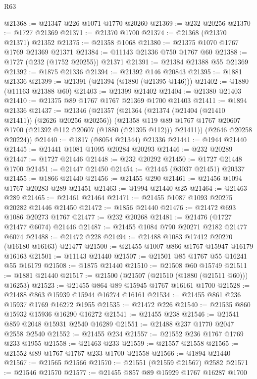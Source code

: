 \begin{lexlean}{R63}
\begin{coremodule}
@21368 := @21347 @226 @1071 @1770 @20260
@21369 := @232 @20256
@21370 := @1727 @21369
@21371 := @21370 @1700
@21374 := @21368 (@21370 @21371) @21352
@21375 := @21358 @1068
@21380 := @21375 @1070 @1767 @1769 @21369 @21371
@21384 := @11143 @21336 @750 @1767 @60
@21388 := @1727 (@232 (@1752 @20255)) @21371
@21391 := @21384 @21388 @55 @21369
@21392 := @1875 @21336
@21394 := @21392 @146 @20843
@21395 := @1881 @21336
@21399 := @21391 (@21394 (@1880 (@21395 @146)))
@21402 := @1880 (@11163 @21388 @60)
@21403 := @21399 @21402
@21404 := @21380 @21403
@21410 := @21375 @89 @1767 @1767 @21369 @1700 @21403
@21411 := @1894 @21336
@21437 := @21346
    (@21357
      (@21364
        (@21374 (@21404 (@21410 @21411)) (@2626 @20256 @20256))
        (@21358
          @119
          @89
          @1767
          @1767
          @20607
          @1700
          (@21392 @112 @20607 (@1880 (@21395 @112)))
          @21411))
      (@2646 @20258 @20224))
@21440 := @1817 (@8054 @21344) @21336
@21441 := @1944 @21440
@21445 := @21441 @1081 @1095 @20284 @20293
@21446 := @232 @20289
@21447 := @1727 @21446
@21448 := @232 @20292
@21450 := @1727 @21448 @1700
@21451 := @21447 @21450
@21454 := @21445 (@3037 @21451) @20337
@21455 := @1866 @21440
@21456 := @21455 @290
@21461 := @21456 @1094 @1767 @20283 @289 @21451
@21463 := @1994 @21440 @25
@21464 := @21463 @289
@21465 := @21461 @21464
@21471 := @21455 @1087 @1093 @20275 @20282 @21446 @21450
@21472 := @1856 @21440
@21476 := @21472 @693 @1086 @20273 @1767
@21477 := @232 @20268
@21481 := @21476 (@1727 @21477 @6074) @21446
@21487 := @21455 @1084 @790 @20271 @2182 @21477 @6074
@21488 := @21472 @228
@21494 := @21488 @1083 @17412 @20270 (@16180 @16163) @21477
@21500 := @21455 @1007 @866 @1767 @15947 @16179 @16163
@21501 := @11143 @21440
@21507 := @21501 @85 @1767 @55 @16241 @55 @16179
@21508 := @1875 @21440
@21510 := @21508 @60 @15749
@21511 := @1881 @21440
@21517 := @21500 (@21507 (@21510 (@1880 (@21511 @60))) @16253)
@21523 := @21455 @864 @89 @15945 @1767 @16161 @1700
@21528 := @21488 @863 @15939 @15944 @16274 @16161
@21534 := @21455 @861 @236 @15937 @1769 @16272 @1955
@21535 := @21472 @226
@21540 := @21535 @860 @15932 @15936 @16290 @16272
@21541 := @21455 @238
@21546 := @21541 @859 @2048 @15931 @2540 @16289
@21551 := @21488 @237 @1770 @2047 @2558 @2540
@21552 := @21455 @234
@21557 := @21552 @236 @1767 @1769 @233 @1955
@21558 := @21463 @233
@21559 := @21557 @21558
@21565 := @21552 @89 @1767 @1767 @233 @1700 @21558
@21566 := @1894 @21440
@21567 := @21565 @21566
@21570 := @21551 (@21559 @21567) @2582
@21571 := @21546 @21570
@21577 := @21455 @857 @89 @15929 @1767 @16287 @1700

\end{coremodule}
\end{lexlean}
